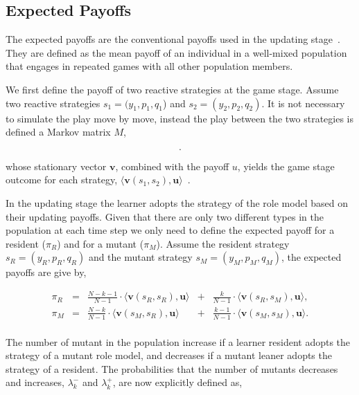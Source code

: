 \documentclass[11pt]{article}
\theoremstyle{plainCl1}
\theoremstyle{plainCl2}
\begin{document}
\subsection*{Expected Payoffs}

The expected payoffs are the conventional payoffs used in the updating
stage~\cite{imhof2010stochastic}. They are defined as the mean payoff of an
individual in a well-mixed population that engages in repeated games with all
other population members.

We first define the payoff of two reactive strategies at the game stage. Assume
two reactive strategies $s_1\!=\!(y_1, p_1, q_1$) and $s_2\!=\!(y_2,p_2,q_2)$.
It is not necessary to simulate the play move by move, instead the play between
the two strategies is defined a Markov matrix \(M\),

\begin{equation}\label{eq:transition_matrix}
  .
\end{equation}

whose stationary vector \(\mathbf{v}\), combined with the payoff \(u\), yields
the game stage outcome for each strategy,
\(\langle\mathbf{v}(s_1,s_2),\mathbf{u}\rangle\)~\cite{Hauert1997}.


In the updating stage the learner adopts the strategy of the role model based on
their updating payoffs. Given that there are only two different types in the
population at each time step we only need to define the expected payoff for a
resident (\(\pi_R\)) and for a mutant (\(\pi_M\)). Assume the resident strategy
\(s_R = (y_R, p_R, q_R)\) and the mutant strategy \(s_M = (y_M, p_M, q_M)\), the
expected payoffs are give by,

\begin{equation} \label{Eq:ExpPay}
  \begin{array}{lcrcr}
  \displaystyle \pi_R	&=	&\displaystyle \frac{N\!-\!k\!-\!1}{N-1}\cdot \langle\mathbf{v}(s_R,s_R),\mathbf{u}\rangle	&+	&\displaystyle\frac{k}{N-1}\cdot \langle\mathbf{v}(s_R,s_M),\mathbf{u}\rangle,\\[0.5cm]
  \displaystyle \pi_M	&=	&\displaystyle\frac{N-k}{N-1}\cdot \langle\mathbf{v}(s_M,s_R),\mathbf{u}\rangle&+	&\displaystyle\frac{k-1}{N-1}\cdot \langle\mathbf{v}(s_M,s_M),\mathbf{u}\rangle.\\
  \end{array}
\end{equation}

The number of mutant in the population increase if a learner resident adopts the
strategy of a mutant role model, and decreases if a mutant leaner adopts the
strategy of a resident. The probabilities that the number of mutants decreases
and increases, \(\lambda^-_k\) and \(\lambda^+_k\), are now explicitly defined
as,
\end{document}
